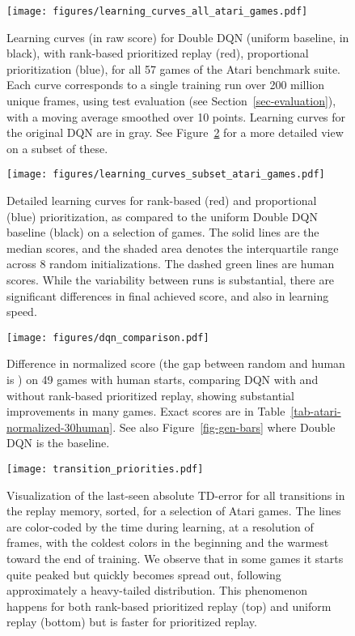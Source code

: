 \documentclass[a4paper]{article}
\begin{document}
\begin{figure}[p]
\centerline{
\texttt{[image: figures/learning\_curves\_all\_atari\_games.pdf]}
}
\caption{
\label{fig-atari-all}
Learning curves (in raw score) for Double DQN (uniform baseline, in black), with rank-based prioritized replay (red), proportional prioritization (blue), for all 57 games of the Atari benchmark suite. Each curve corresponds to a single training run over 200 million unique frames, using test evaluation (see Section~\ref{sec-evaluation}),  with a moving average smoothed over 10 points. Learning curves for the original DQN are in gray. See Figure~\ref{fig-atari-subset-detailed} for a more detailed view on a subset of these. 
}
\end{figure}


\begin{figure}[p]
\centerline{
\texttt{[image: figures/learning\_curves\_subset\_atari\_games.pdf]}
}
\caption{
\label{fig-atari-subset-detailed}
Detailed learning curves for rank-based (red) and proportional (blue) prioritization, as compared to the uniform Double DQN baseline (black) on a selection of games.
The solid lines are the median scores, and the shaded area denotes the interquartile range across 8 random initializations.  The dashed green lines are human scores.
While the variability between runs is substantial, there are significant differences in final achieved score, and also in learning speed.
}
\end{figure}


\begin{figure}[p]
\centerline{
\texttt{[image: figures/dqn\_comparison.pdf]} }
\caption{
\label{fig-dqn-bars}
Difference in normalized score (the gap between random and human is ) on 49 games with human starts, comparing DQN with and without rank-based prioritized replay, 
showing substantial improvements in many games.  Exact scores are in Table~\ref{tab-atari-normalized-30human}.
See also Figure~\ref{fig-gen-bars} where Double DQN is the baseline.
}
\end{figure}






\begin{figure}[p]
\centerline{
\texttt{[image: transition\_priorities.pdf]}
}
\caption{
\label{fig-transition-priorities}
Visualization of the last-seen absolute TD-error for all transitions in the replay memory, sorted, for a selection of Atari games. 
The lines are color-coded by the time during learning, at a resolution of  frames, with the coldest colors in the beginning and the warmest toward the end of training.
We observe that in some games it starts quite peaked but quickly becomes spread out, following approximately a heavy-tailed distribution. This phenomenon happens for both rank-based prioritized replay (top) and uniform replay (bottom) but is faster for prioritized replay.
}
\end{figure}
\end{document}
